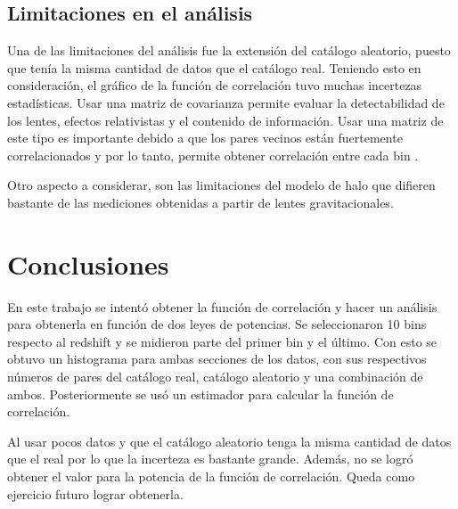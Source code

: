 \documentclass[twocolumn,letterpaper,spanish]{revtex4}
\numberwithin{equation}{section}
\begin{document}
\subsection{Limitaciones en el an\'alisis}
Una de las limitaciones del an\'alisis fue la extensi\'on del cat\'alogo aleatorio, puesto que ten\'ia la misma cantidad de datos que el cat\'alogo real. Teniendo esto en consideraci\'on, el gr\'afico de la funci\'on de correlaci\'on tuvo muchas incertezas estad\'isticas. 
Usar una matriz de covarianza permite evaluar la detectabilidad de los lentes, efectos relativistas y el contenido de informaci\'on. Usar una matriz de este tipo es importante debido a que los pares vecinos est\'an fuertemente correlacionados y por lo tanto, permite obtener correlaci\'on entre cada bin \cite{sawangwit}.

Otro aspecto a considerar, son las limitaciones del modelo de halo que difieren bastante de las mediciones obtenidas a partir de lentes gravitacionales.

\section{Conclusiones}

En este trabajo se intent\'o obtener la funci\'on de correlaci\'on y hacer un an\'alisis para obtenerla en funci\'on de dos leyes de potencias. Se seleccionaron 10 bins respecto al redshift y se midieron parte del primer bin y el \'ultimo. Con esto se obtuvo un histograma para ambas secciones de los datos, con sus respectivos n\'umeros de pares del cat\'alogo real, cat\'alogo aleatorio y una combinaci\'on de ambos. Posteriormente se us\'o un estimador para calcular la funci\'on de correlaci\'on.

Al usar pocos datos y que el cat\'alogo aleatorio tenga la misma cantidad de datos que el real por lo que la incerteza es bastante grande. Adem\'as, no se logr\'o obtener el valor para la potencia de la funci\'on de correlaci\'on. Queda como ejercicio futuro lograr obtenerla.

%
\end{document}
